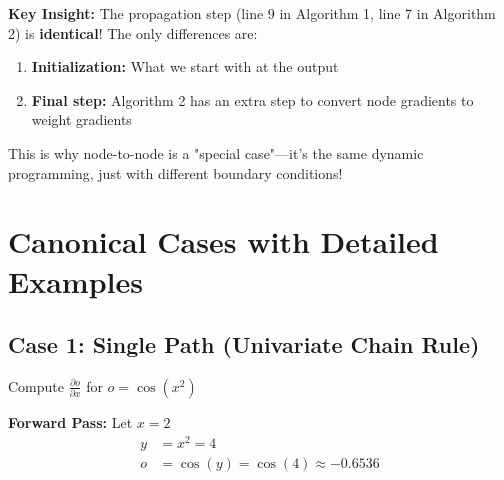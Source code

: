 \begin{notechapter}
\textbf{Key Insight:} The propagation step (line 9 in Algorithm 1, line 7 in Algorithm 2) is \textbf{identical}! The only differences are:
\begin{enumerate}
    \item \textbf{Initialization:} What we start with at the output
    \item \textbf{Final step:} Algorithm 2 has an extra step to convert node gradients to weight gradients
\end{enumerate}

This is why node-to-node is a "special case"—it's the same dynamic programming, just with different boundary conditions!

\section{Canonical Cases with Detailed Examples}

\subsection{Case 1: Single Path (Univariate Chain Rule)}

\begin{example}
Compute $\frac{\partial o}{\partial x}$ for $o = \cos(x^2)$
\end{example}

\begin{center}
\end{center}

\textbf{Forward Pass:} Let $x = 2$
\begin{align*}
y &= x^2 = 4\\
o &= \cos(y) = \cos(4) \approx -0.6536
\end{align*}


\end{notechapter}
